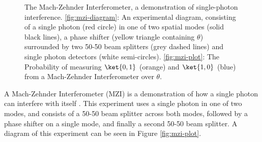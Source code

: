 \begin{figure}
\hfill
{}
\caption[Experimental setup of the Mach-Zehnder Interferometer and probability of outcomes over phase $\theta$]{\label{fig:mzi}The Mach-Zehnder Interferometer, a demonstration of single-photon interference. \ref{fig:mzi-diagram}: An experimental diagram, consisting of a single photon (red circle) in one of two spatial modes (solid black lines), a phase shifter (yellow triangle containing $\theta$) surrounded by two 50-50 beam splitters (grey dashed lines) and single photon detectors (white semi-circles). \ref{fig:mzi-plot}: The Probability of measuring $\ket{0,1}$ (orange) and $\ket{1,0}$ (blue) from a Mach-Zehnder Interferometer over $\theta$.}
\end{figure}

A Mach-Zehnder Interferometer (MZI) is a demonstration of how a single photon can interfere with itself \cite{zehnder1891,mach1892}. This experiment uses a single photon in one of two modes, and consists of a 50-50 beam splitter across both modes, followed by a phase shifter on a single mode, and finally a second 50-50 beam splitter. A diagram of this experiment can be seen in Figure \ref{fig:mzi-plot}.

